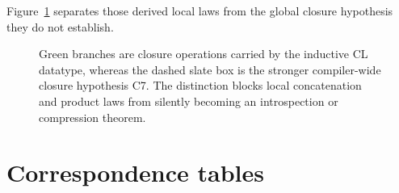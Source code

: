 Figure~\ref{fig:structural-hypothesis} separates those derived local laws from
the global closure hypothesis they do not establish.
\begin{figure}[H]
\centering

\caption{Green branches are closure operations carried by the inductive CL datatype, whereas the dashed slate box is the stronger compiler-wide closure hypothesis C7.  The distinction blocks local concatenation and product laws from silently becoming an introspection or compression theorem.}
\label{fig:structural-hypothesis}
\end{figure}

\section{Correspondence tables}
\label{sec:tables}

